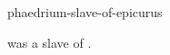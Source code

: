 \documentclass{stex}
\begin{document}
\begin{smodule}{phaedrium-slave-of-epicurus}
\begin{sparagraph}[style=symdoc]
 was a slave of .
\end{sparagraph}
\end{smodule}
\end{document}
